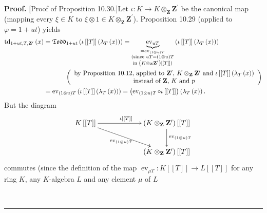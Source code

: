 \documentclass[numbers=enddot,12pt,final,onecolumn,notitlepage]{scrartcl}%
\newenvironment{proof}[1][Proof]{\noindent\textbf{#1.} }{\ \rule{0.5em}{0.5em}}
\begin{document}
\begin{proof}
[Proof of Proposition 10.30.]Let $\iota:K\rightarrow K\otimes_{\mathbf{Z}%
}\mathbf{Z}^{\prime}$ be the canonical map (mapping every $\xi\in K$ to
$\xi\otimes1\in K\otimes_{\mathbf{Z}}\mathbf{Z}^{\prime}$). Proposition 10.29
(applied to $\varphi=1+ut$) yields%
\begin{align*}
\operatorname*{td}\nolimits_{1+ut,T,\mathbf{Z}^{\prime}}\left(  x\right)   &
=\mathfrak{Todd}_{1+ut}\left(  \iota\left[  \left[  T\right]  \right]  \left(
\lambda_{T}\left(  x\right)  \right)  \right)  =\underbrace{\operatorname*{ev}%
\nolimits_{uT}}_{\substack{=\operatorname*{ev}\nolimits_{\left(  1\otimes
u\right)  T}\\\text{(since }uT=\left(  1\otimes u\right)  T\\\text{in }\left(
K\otimes_{\mathbf{Z}}\mathbf{Z}^{\prime}\right)  \left[  \left[  T\right]
\right]  \text{)}}}\left(  \iota\left[  \left[  T\right]  \right]  \left(
\lambda_{T}\left(  x\right)  \right)  \right) \\
&  \ \ \ \ \ \ \ \ \ \ \left(
\begin{array}
[c]{c}%
\text{by Proposition 10.12, applied to }\mathbf{Z}^{\prime}\text{, }%
K\otimes_{\mathbf{Z}}\mathbf{Z}^{\prime}\text{ and }\iota\left[  \left[
T\right]  \right]  \left(  \lambda_{T}\left(  x\right)  \right) \\
\text{instead of }\mathbf{Z}\text{, }K\text{ and }p
\end{array}
\right) \\
&  =\operatorname*{ev}\nolimits_{\left(  1\otimes u\right)  T}\left(
\iota\left[  \left[  T\right]  \right]  \left(  \lambda_{T}\left(  x\right)
\right)  \right)  =\left(  \operatorname*{ev}\nolimits_{\left(  1\otimes
u\right)  T}\circ\iota\left[  \left[  T\right]  \right]  \right)  \left(
\lambda_{T}\left(  x\right)  \right)  .
\end{align*}
But the diagram%
\[
\xymatrixcolsep{5pc}\xymatrix{
K \left[\left[T\right]\right] \ar[r]^{\iota \left[\left[T\right]\right]} \ar[dr]_{\operatorname*{ev}_{\left(1\otimes u\right)T}} & \left(K \otimes_{\mathbf Z} \mathbf Z^{\prime}\right) \left[\left[T\right]\right] \ar[d]^{\operatorname*{ev}_{\left(1\otimes u\right)T}} \\
&  \left(K \otimes_{\mathbf Z} \mathbf Z^{\prime}\right) \left[\left[T\right]\right]
}
\]
commutes (since the definition of the map $\operatorname*{ev}\nolimits_{\mu
T}:K\left[  \left[  T\right]  \right]  \rightarrow L\left[  \left[  T\right]
\right]  $ for any ring $K$, any $K$-algebra $L$ and any element $\mu$ of $L$

\end{proof}
\end{document}
